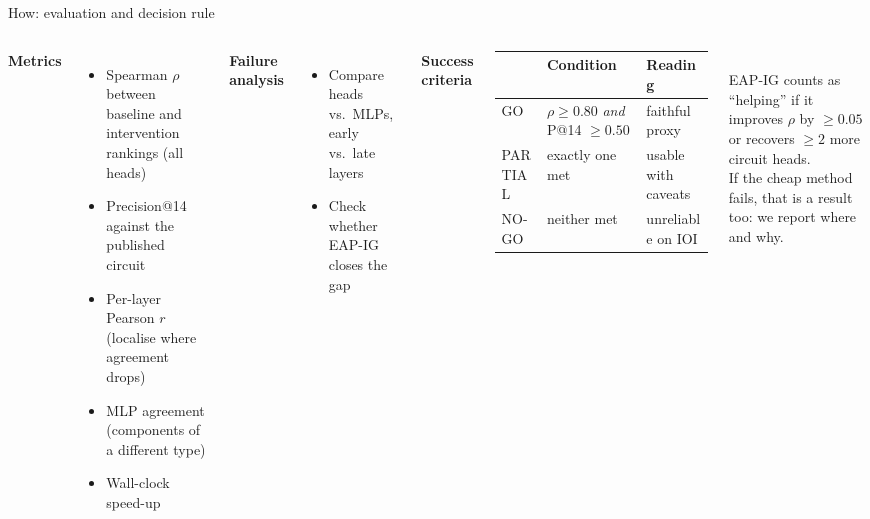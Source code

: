 \documentclass[aspectratio=169,10pt]{beamer}
\begin{document}
\begin{frame}{How: evaluation and decision rule}
\begin{columns}[T]
\textbf{Metrics}
\begin{itemize}
\item Spearman $\rho$ between baseline and intervention rankings (all heads)
\item Precision@14 against the published circuit
\item Per-layer Pearson $r$ (localise where agreement drops)
\item MLP agreement (components of a different type)
\item Wall-clock speed-up
\end{itemize}
\textbf{Failure analysis}
\begin{itemize}
\item Compare heads vs.\ MLPs, early vs.\ late layers
\item Check whether EAP-IG closes the gap
\end{itemize}
\textbf{Success criteria}\\[2pt]
\footnotesize
\begin{tabular}{@{}lp{3.2cm}p{3.2cm}@{}}
\toprule
 & \textbf{Condition} & \textbf{Reading}\\
\midrule
GO & $\rho\ge0.80$ \emph{and} P@14 $\ge0.50$ & faithful proxy\\[2pt]
PARTIAL & exactly one met & usable with caveats\\[2pt]
NO-GO & neither met & unreliable on IOI\\
\bottomrule
\end{tabular}\\[6pt]
EAP-IG counts as ``helping'' if it improves $\rho$ by $\ge0.05$ or recovers $\ge2$ more circuit heads.\\[6pt]
If the cheap method fails, that is a result too: we report where and why.
\end{columns}
\end{frame}
\end{document}

